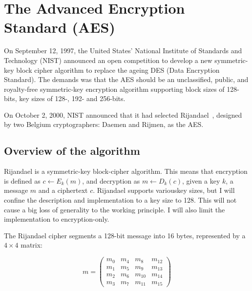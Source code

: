 \section{The Advanced Encryption Standard (AES)}

On September 12, 1997, the United States' National Institute of
Standards and Technology (NIST) announced an open competition to
develop a new symmetric-key block cipher algorithm to replace the
ageing DES (Data Encryption Standard). The demands was that the AES
should be an unclassified, public, and royalty-free symmetric-key
encryption algorithm supporting block sizes of 128-bits, key sizes of
128-, 192- and 256-bits.

On October 2, 2000, NIST announced that it had selected
Rijandael~\cite{rijandael}, designed by two Belgium cryptographers:
Daemen and Rijmen, as the AES.


\subsection{Overview of the algorithm}

Rijandael is a symmetric-key block-cipher algorithm. This means that
encryption is defined as $c \leftarrow E_k(m)$, and decryption as $m
\leftarrow D_k(c)$, given a key $k$, a message $m$ and a ciphertext
$c$. Rijandael supports variouskey sizes, but I will confine the
description and implementation to a key size to
\unit{128}{\bit}. This will not cause a big loss of generality to the
working principle. I will also limit the implementation to
encryption-only.

The Rijandael cipher segments a 128-bit message into 16 bytes,
represented by a $4 \times 4$ matrix:

\begin{equation}
  m = \begin{pmatrix}
    m_0 & m_4 & m_8 & m_{12} \\
    m_1 & m_5 & m_9 & m_{13} \\
    m_2 & m_6 & m_{10} & m_{14} \\
    m_3 & m_7 & m_{11} & m_{15}
    \end{pmatrix}
\end{equation}

